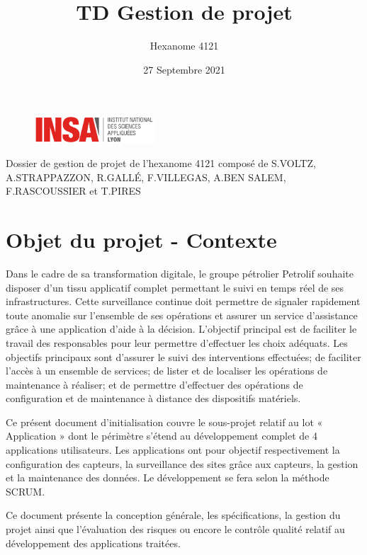 \documentclass[a4paper]{article}
\title{TD Gestion de projet}
\author{Hexanome 4121}
\date{27 Septembre 2021}
\begin{document}
\maketitle

\begin{figure}[h]
\centering
\includegraphics[width=0.4\textwidth]{Logo_INSA.png}
\end{figure}

\begin{center}
Dossier de gestion de projet de l'hexanome 4121 composé de S.VOLTZ, A.STRAPPAZZON, R.GALLÉ, F.VILLEGAS, A.BEN SALEM, F.RASCOUSSIER et T.PIRES
\end{center}

\newpage

\tableofcontents

	
	\newpage
	\section{Objet du projet - Contexte}
Dans le cadre de sa transformation digitale, le groupe pétrolier Petrolif souhaite disposer d’un tissu applicatif complet permettant le suivi en temps réel de ses infrastructures. Cette surveillance continue doit permettre de signaler rapidement toute anomalie sur l’ensemble de ses opérations et assurer un service d’assistance grâce à une application d’aide à la décision. L’objectif principal est de faciliter le travail des responsables pour leur permettre d’effectuer les choix adéquats. Les objectifs principaux sont d’assurer le suivi des interventions effectuées; de faciliter l’accès à un ensemble de services; de lister et de localiser les opérations de maintenance à réaliser; et de permettre d'effectuer des opérations de configuration et de maintenance à distance des dispositifs matériels.

Ce présent document d’initialisation couvre le sous-projet relatif au lot « Application » dont le périmètre s'étend au développement complet de 4 applications utilisateurs. Les applications ont pour objectif respectivement la configuration des capteurs, la surveillance des sites grâce aux capteurs, la gestion et la maintenance des données. Le développement se fera selon la méthode SCRUM. 

Ce document présente la conception générale, les spécifications, la gestion du projet ainsi que l’évaluation des risques ou encore le contrôle qualité relatif au développement des applications traitées.
	\newpage
	
\end{document}
